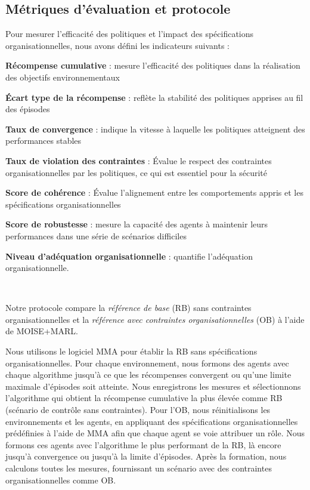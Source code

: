 \subsection{Métriques d'évaluation et protocole}

Pour mesurer l'efficacité des politiques et l'impact des spécifications organisationnelles, nous avons défini les indicateurs suivants :
%
\begin{enumerate*}[label={\roman*)}, itemjoin={; \quad}]
    \item \textbf{Récompense cumulative} : mesure l'efficacité des politiques dans la réalisation des objectifs environnementaux
    \item \textbf{Écart type de la récompense} : reflète la stabilité des politiques apprises au fil des épisodes
    \item \textbf{Taux de convergence} : indique la vitesse à laquelle les politiques atteignent des performances stables
    \item \textbf{Taux de violation des contraintes} : Évalue le respect des contraintes organisationnelles par les politiques, ce qui est essentiel pour la sécurité
    \item \textbf{Score de cohérence} : Évalue l'alignement entre les comportements appris et les spécifications organisationnelles
    \item \textbf{Score de robustesse} : mesure la capacité des agents à maintenir leurs performances dans une série de scénarios difficiles
    \item \textbf{Niveau d'adéquation organisationnelle} : quantifie l'adéquation organisationnelle.
\end{enumerate*}

\

\noindent Notre protocole compare la \textit{référence de base} (RB) sans contraintes organisationnelles et la \textit{référence avec contraintes organisationnelles} (OB) à l'aide de MOISE+MARL.

Nous utilisons le logiciel MMA pour établir la RB sans spécifications organisationnelles. Pour chaque environnement, nous formons des agents avec chaque algorithme jusqu'à ce que les récompenses convergent ou qu'une limite maximale d'épisodes soit atteinte. Nous enregistrons les mesures et sélectionnons l'algorithme qui obtient la récompense cumulative la plus élevée comme RB (scénario de contrôle sans contraintes).
%
Pour l'OB, nous réinitialisons les environnements et les agents, en appliquant des spécifications organisationnelles prédéfinies à l'aide de MMA afin que chaque agent se voie attribuer un rôle. Nous formons ces agents avec l'algorithme le plus performant de la RB, là encore jusqu'à convergence ou jusqu'à la limite d'épisodes. Après la formation, nous calculons toutes les mesures, fournissant un scénario avec des contraintes organisationnelles comme OB.

